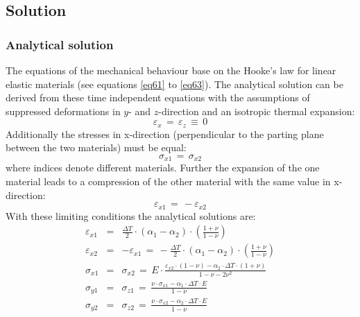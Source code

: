 
\subsection{Solution}
\subsubsection{Analytical solution}
The equations of the mechanical behaviour base on the Hooke's law for linear elastic materials (see equations \eqref{eq61} to \eqref{eq63}). The analytical solution can be derived from these time independent equations with the assumptions of suppressed deformations in $y$- and $z$-direction and an isotropic thermal expansion:
\begin{displaymath}
\varepsilon_x\,=\,\varepsilon_z\,\equiv\,0
\end{displaymath}
Additionally the stresses in x-direction (perpendicular to the parting plane between the two materials) must be equal:
\begin{displaymath}
\sigma_{x1}\,=\,\sigma_{x2}
\end{displaymath}
where indices denote different materials. 
Further the expansion of the one material leads to a compression of the other material with the same value in x-direction:
\begin{displaymath}
\varepsilon_{x1}\,=\,-\varepsilon_{x2}
\end{displaymath}
With these limiting conditions the analytical solutions are:
\begin{eqnarray}
\varepsilon_{x1} & = &
\frac{\Delta T}{2}\cdot\left(\alpha_1-\alpha_2\right)\cdot
\left(\frac{1+\nu}{1-\nu}\right)
\label{eq65} \\[1.5ex]
\varepsilon_{x2} & = & -\varepsilon_{x1}\,=\,
-\frac{\Delta T}{2}\cdot\left(\alpha_1-\alpha_2\right)\cdot
\left(\frac{1+\nu}{1-\nu}\right)
\label{eq66} \\[1.5ex]
\sigma_{x1} & = & \sigma_{x2}\,=\, E\cdot
\frac{\varepsilon_{x2}\cdot\left(1-\nu\right)-\alpha_2\cdot\Delta T\cdot\left(1+\nu\right)}{1-\nu-2\nu^2}
\label{eq67} \\[1.5ex]
\sigma_{y1} & = & \sigma_{z1}\,=\,
\frac{\nu\cdot\sigma_{x1}-\alpha_1\cdot\Delta T\cdot E}{1-\nu}
\label{eq68} \\[1.5ex]
\sigma_{y2} & = & \sigma_{z2}\,=\,
\frac{\nu\cdot\sigma_{x2}-\alpha_2\cdot\Delta T\cdot E}{1-\nu}
\label{eq69}
\end{eqnarray}
%

